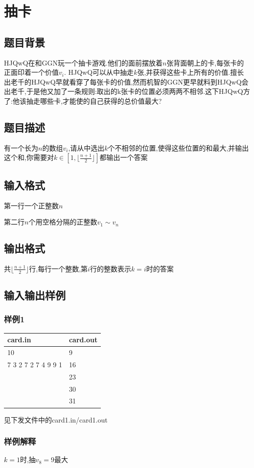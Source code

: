 \documentclass[12pt]{ctexart}
\begin{document}
	\section{抽卡}
	\subsection{题目背景}
	HJQwQ在和GGN玩一个抽卡游戏.他们的面前摆放着$n$张背面朝上的卡,每张卡的正面印着一个价值$v_i$. HJQwQ可以从中抽走$k$张,并获得这些卡上所有的价值.擅长出老千的HJQwQ早就看穿了每张卡的价值,然而机智的GGN更早就料到HJQwQ会出老千,于是他又加了一条规则:取出的k张卡的位置必须两两不相邻.这下HJQwQ方了:他该抽走哪些卡,才能使的自己获得的总价值最大?
	\subsection{题目描述}
	有一个长为$n$的数组$v_i$,请从中选出$k$个不相邻的位置,使得这些位置的和最大,并输出这个和,你需要对$k\in\left[1,\lfloor\frac{n+1}2\rfloor\right]$都输出一个答案
	\subsection{输入格式}
	第一行一个正整数$n$

	第二行$n$个用空格分隔的正整数$v_1\sim v_n$
	\subsection{输出格式}
	共$\lfloor\frac{n+1}2\rfloor$行,每行一个整数,第$i$行的整数表示$k=i$时的答案
	\subsection{输入输出样例}
	\subsubsection{样例1}
	\begin{center}
		\begin{tabular}{|p{6cm}|p{6cm}|}
			\hline card.in&card.out\\
			\hline	10&9\\
					7 3 2 7 2 7 4 9 9 1&16\\
					&23\\
					&30\\
					&31\\
			\hline
		\end{tabular}
	\end{center}
	见下发文件中的card1.in/card1.out
	\subsubsection{样例解释}
	$k=1$时,抽$v_8=9$最大
\end{document}

